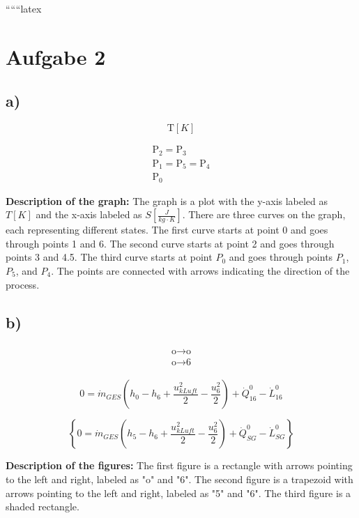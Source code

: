 
``````latex


\section*{Aufgabe 2}

\subsection*{a)}

\[
\text{T} [K]
\]

\[
\begin{array}{c}
\text{P}_2 = \text{P}_3 \\
\text{P}_1 = \text{P}_5 = \text{P}_4 \\
\text{P}_0
\end{array}
\]

\noindent
\textbf{Description of the graph:} The graph is a plot with the y-axis labeled as \( T[K] \) and the x-axis labeled as \( S \left[ \frac{J}{kg \cdot K} \right] \). There are three curves on the graph, each representing different states. The first curve starts at point 0 and goes through points 1 and 6. The second curve starts at point 2 and goes through points 3 and 4.5. The third curve starts at point \( P_0 \) and goes through points \( P_1 \), \( P_5 \), and \( P_4 \). The points are connected with arrows indicating the direction of the process.

\subsection*{b)}

\[
\begin{array}{c}
\begin{array}{c}
\text{o} \rightarrow \text{o} \\
\text{o} \rightarrow \text{6}
\end{array}
\end{array}
\]

\[
0 = \dot{m}_{GES} \left( h_0 - h_6 + \frac{u_{kLuft}^2}{2} - \frac{u_6^2}{2} \right) + \dot{Q}_{16}^0 - \dot{L}_{16}^0
\]

\[
\left\{
0 = \dot{m}_{GES} \left( h_5 - h_6 + \frac{u_{kLuft}^2}{2} - \frac{u_6^2}{2} \right) + \dot{Q}_{SG}^0 - \dot{L}_{SG}^0
\right\}
\]

\noindent
\textbf{Description of the figures:} The first figure is a rectangle with arrows pointing to the left and right, labeled as "o" and "6". The second figure is a trapezoid with arrows pointing to the left and right, labeled as "5" and "6". The third figure is a shaded rectangle.

